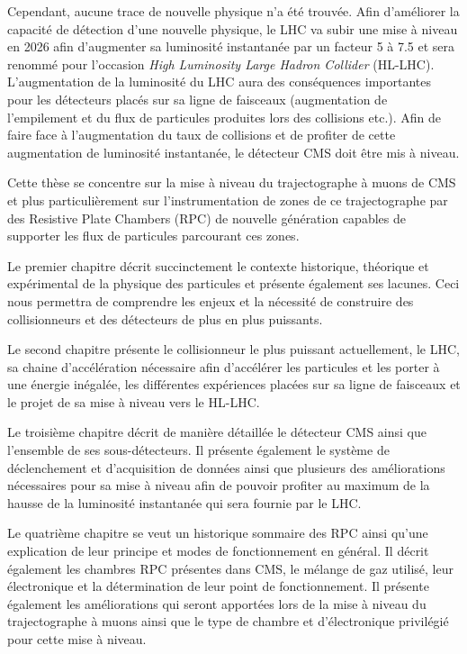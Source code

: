 \vspace*{-0.4cm}
Cependant, aucune trace de nouvelle physique n'a été trouvée. Afin d'améliorer la capacité de détection d'une nouvelle physique, le LHC va subir une mise à niveau en \num{2026} afin d'augmenter sa luminosité instantanée par un facteur \num{5} à \num{7.5} et sera renommé pour l'occasion \textit{High Luminosity Large Hadron Collider} (HL-LHC). L'augmentation de la luminosité du LHC aura des conséquences importantes pour les détecteurs placés sur sa ligne de faisceaux (augmentation de l'empilement et du flux de particules produites lors des collisions etc.). Afin de faire face à l'augmentation du taux de collisions et de profiter de cette augmentation de luminosité instantanée, le détecteur CMS doit être mis à niveau. 

Cette thèse se concentre sur la mise à niveau du trajectographe à muons de CMS et plus particulièrement sur l'instrumentation de zones de ce trajectographe par des Resistive Plate Chambers (RPC) de nouvelle génération capables de supporter les flux de particules parcourant ces zones. 

Le premier chapitre décrit succinctement le contexte historique, théorique et expérimental de la physique des particules et présente également ses lacunes. Ceci nous permettra de comprendre les enjeux et la nécessité de construire des collisionneurs et des détecteurs de plus en plus puissants.

Le second chapitre présente le collisionneur le plus puissant actuellement, le LHC, sa chaine d'accélération nécessaire afin d'accélérer les particules et les porter à une énergie inégalée, les différentes expériences placées sur sa ligne de faisceaux et le projet de sa mise à niveau vers le HL-LHC.

Le troisième chapitre décrit de manière détaillée le détecteur CMS ainsi que l'ensemble de ses sous-détecteurs. Il présente également le système de déclenchement et d'acquisition de données ainsi que plusieurs des améliorations nécessaires pour sa mise à niveau afin de pouvoir profiter au maximum de la hausse de la luminosité instantanée qui sera fournie par le LHC.

Le quatrième chapitre se veut un historique sommaire des RPC ainsi qu'une explication de leur principe et modes de fonctionnement en général. Il décrit également les chambres RPC présentes dans CMS, le mélange de gaz utilisé, leur électronique et la détermination de leur point de fonctionnement. Il présente également les améliorations qui seront apportées lors de la mise à niveau du trajectographe à muons ainsi que le type de chambre et d'électronique privilégié pour cette mise à niveau.

